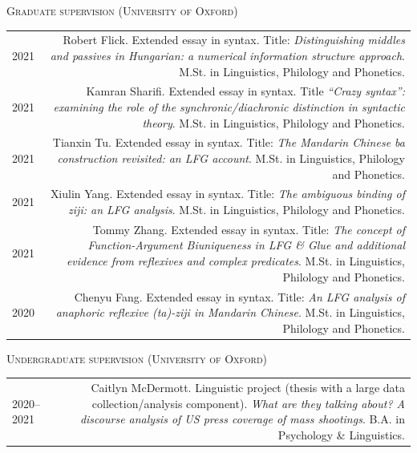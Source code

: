 \documentclass[11pt,a4paper]{article}
\makeatletter
\newlength{\rulelength}%
\newenvironment{cvsection}{%
  \setlength{\extrarowheight}{0.70ex}
  \begin{longtable}[l]{@{} L R @{}}
}{%
  \end{longtable}
}
\newcommand{\cvheading}[1]{\noindent{{\color{headercolor}\rule[0.4ex]{\rulelength}{2pt}\hspace*{9pt} \Large #1}}\vspace*{0.5\baselineskip}}
\newcommand{\cvsubhead}[1]{\noindent\hspace*{\rulelength}\hspace*{9pt} \textsc{#1}\vspace*{0.25\baselineskip}}
\newcommand{\rulesubhead}[1]{\noindent{\color{headercolor}\rule[0.4ex]{\rulelength}{1pt}\hspace*{9pt} {#1}}\vspace*{0.25\baselineskip}}
\makeatother
\begin{document}
\cvheading{Supervision}


\cvsubhead{Graduate supervision (University of Oxford)}

\begin{cvsection}
  2021 & Robert Flick. Extended essay in syntax. Title: \textit{Distinguishing
    middles and passives in Hungarian: a numerical information structure
    approach}. M.St. in Linguistics, Philology and Phonetics. \\

  2021 & Kamran Sharifi. Extended essay in syntax. Title \textit{``Crazy
    syntax'': examining the role of the synchronic/diachronic distinction in
    syntactic theory}. M.St. in Linguistics, Philology and Phonetics.\\

  2021 & Tianxin Tu. Extended essay in syntax. Title: \textit{The Mandarin
    Chinese \emph{ba} construction revisited: an LFG account}. M.St. in Linguistics, Philology and Phonetics.\\

  2021 & Xiulin Yang. Extended essay in syntax. Title: \textit{The ambiguous
    binding of \emph{ziji}: an LFG analysis}. M.St. in Linguistics, Philology and Phonetics.\\

  2021 & Tommy Zhang. Extended essay in syntax. Title: \textit{The concept of
    Function-Argument Biuniqueness in LFG \& Glue and additional evidence
    from reflexives and complex predicates}. M.St. in Linguistics, Philology and Phonetics.\\

  2020 & Chenyu Fang. Extended essay in syntax. Title: \textit{An LFG analysis
    of anaphoric reflexive \emph{(ta)-ziji} in Mandarin Chinese}. M.St. in
  Linguistics, Philology and Phonetics.
\end{cvsection}

\cvsubhead{Undergraduate supervision (University of Oxford)}

\begin{cvsection}
  2020--2021 & Caitlyn McDermott. Linguistic project (thesis with a large data
  collection\slash analysis component). \textit{What are they talking about? A discourse analysis of US press coverage of mass shootings}. B.A. in Psychology \& Linguistics.\\
\end{cvsection}
\end{document}

